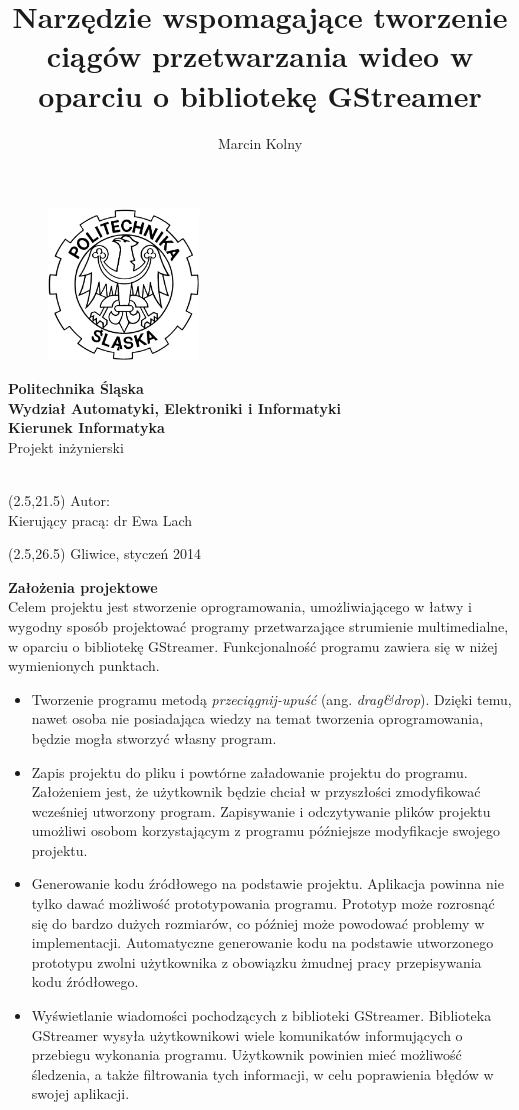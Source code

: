 \documentclass[12pt]{article}
\title{Narzędzie wspomagające tworzenie ciągów przetwarzania wideo w oparciu o bibliotekę GStreamer}
\author{Marcin Kolny}
\renewcommand{\maketitle}{
  \begin{titlepage}
    \begin{figure}  
      \includegraphics[width=40mm]{img/polsl-logo.png}
    \end{figure}
    \begin{center}
      \begingroup
      \fontsize{18pt}{21pt}\selectfont
      \textbf{Politechnika Śląska\\
        Wydział Automatyki, Elektroniki i Informatyki\\
        Kierunek Informatyka}\\
      \vspace{22mm}
      Projekt inżynierski\\
      \vspace{22mm}
      \endgroup
      \begingroup
      \fontsize{14pt}{17pt}\selectfont
      \thetitle \\
      \endgroup
      \vspace{30mm}
    \end{center}
    \begin{textblock}{14}(2.5,21.5)
      \fontsize{14pt}{17pt}\selectfont
      Autor: \theauthor \\
      Kierujący pracą: dr Ewa Lach\\
    \end{textblock}
    \begin{textblock}{20}(2.5,26.5)
      \fontsize{14pt}{17pt}\selectfont
      Gliwice, styczeń 2014\\
    \end{textblock}

  \end{titlepage}
}
\begin{document}
\maketitle
\tableofcontents
\cleardoublepage
\textbf{\Large Założenia projektowe} \\
Celem projektu jest stworzenie oprogramowania, umożliwiającego w łatwy i wygodny sposób projektować programy przetwarzające strumienie multimedialne, w oparciu o bibliotekę GStreamer. Funkcjonalność programu zawiera się w niżej wymienionych punktach.
\begin{itemize}
 \setlength{\itemsep}{0em}
\item Tworzenie programu metodą \textit{przeciągnij-upuść} (ang. \textit{drag\&drop}). Dzięki temu, nawet osoba nie posiadająca wiedzy na temat tworzenia oprogramowania, będzie mogła stworzyć własny program.
\item Zapis projektu do pliku i powtórne załadowanie projektu do programu. Założeniem jest, że użytkownik będzie chciał w przyszłości zmodyfikować wcześniej utworzony program. Zapisywanie i odczytywanie plików projektu umożliwi osobom korzystającym z programu późniejsze modyfikacje swojego projektu.
\item Generowanie kodu źródłowego na podstawie projektu. Aplikacja powinna nie tylko dawać możliwość prototypowania programu. Prototyp może rozrosnąć się do bardzo dużych rozmiarów, co później może powodować problemy w implementacji. Automatyczne generowanie kodu na podstawie utworzonego prototypu zwolni użytkownika z obowiązku żmudnej pracy przepisywania kodu źródłowego.
\item Wyświetlanie wiadomości pochodzących z biblioteki GStreamer. Biblioteka GStreamer wysyła użytkownikowi wiele komunikatów informujących o przebiegu wykonania programu. Użytkownik powinien mieć możliwość śledzenia, a także filtrowania tych informacji, w celu poprawienia błędów w swojej aplikacji.
\end{itemize}
\cleardoublepage
\end{document}
